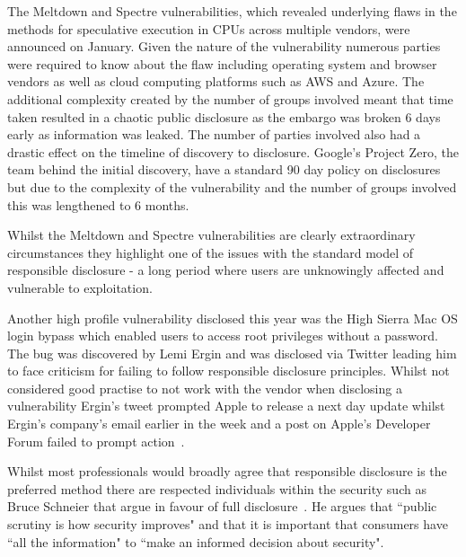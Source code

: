 \documentclass[]{final_report}
\begin{document}
The Meltdown and Spectre vulnerabilities, which revealed underlying flaws in the methods for speculative execution in CPUs across multiple vendors, were announced on January. Given the nature of the vulnerability numerous parties were required to know about the flaw including operating system and browser vendors as well as cloud computing platforms such as AWS and Azure. The additional complexity created by the number of groups involved meant that time taken resulted in a chaotic public disclosure as the embargo was broken 6 days early as information was leaked. The number of parties involved also had a drastic effect on the timeline of discovery to disclosure. Google's Project Zero, the team behind the initial discovery, have a standard 90 day policy on disclosures but due to the complexity of the vulnerability and the number of groups involved this was lengthened to 6 months.

Whilst the Meltdown and Spectre vulnerabilities are clearly extraordinary circumstances they highlight one of the issues with the standard model of responsible disclosure - a long period where users are unknowingly affected and vulnerable to exploitation.

Another high profile vulnerability disclosed this year was the High Sierra Mac OS login bypass which enabled users to access root privileges without a password. The bug was discovered by Lemi Ergin and was disclosed via Twitter leading him to face criticism for failing to follow responsible disclosure principles. Whilst not considered good practise to not work with the vendor when disclosing a vulnerability Ergin's tweet prompted Apple to release a next day update whilst Ergin's company's email earlier in the week and a post on Apple's Developer Forum failed to prompt action~\cite{ergin-disclosure}.

Whilst most professionals would broadly agree that responsible disclosure is the preferred method there are respected individuals within the security such as Bruce Schneier that argue in favour of full disclosure~\cite{debating-full-disclosure}. He argues that ``public scrutiny is how security improves" and that it is important that consumers have ``all the information" to ``make an informed decision about security".
\end{document}
